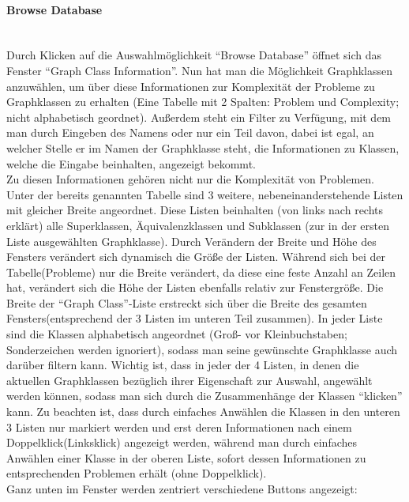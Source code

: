 \documentclass[10pt,a4paper]{article}
\begin{document}
\paragraph{Browse Database}\ \\
Durch Klicken auf die Auswahlmöglichkeit "`Browse Database"' öffnet sich das Fenster "`Graph Class Information"'. Nun hat man die Möglichkeit Graphklassen anzuwählen, um über diese Informationen zur Komplexität der Probleme zu Graphklassen zu erhalten (Eine Tabelle mit 2 Spalten: Problem und Complexity; nicht alphabetisch geordnet). Außerdem steht ein Filter zu Verfügung, mit dem man durch Eingeben des Namens oder nur ein Teil davon, dabei ist egal, an welcher Stelle er im Namen der Graphklasse steht, die Informationen zu Klassen, welche die Eingabe beinhalten, angezeigt bekommt.\\
Zu diesen Informationen gehören nicht nur die Komplexität von Problemen. Unter der bereits genannten Tabelle sind 3 weitere, nebeneinanderstehende Listen mit gleicher Breite angeordnet. Diese Listen beinhalten (von links nach rechts erklärt) alle Superklassen, Äquivalenzklassen und Subklassen (zur in der ersten Liste ausgewählten Graphklasse). Durch Verändern der Breite und Höhe des Fensters verändert sich dynamisch die Größe der Listen. Während sich bei der Tabelle(Probleme) nur die Breite verändert, da diese eine feste Anzahl an Zeilen hat, verändert sich die Höhe der Listen ebenfalls relativ zur Fenstergröße. Die Breite der "`Graph Class"'-Liste erstreckt sich über die Breite des gesamten Fensters(entsprechend der 3 Listen im unteren Teil zusammen). In jeder Liste sind die Klassen alphabetisch angeordnet (Groß- vor Kleinbuchstaben; Sonderzeichen werden ignoriert), sodass man seine gewünschte Graphklasse auch darüber filtern kann. Wichtig ist, dass in jeder der 4 Listen, in denen die aktuellen Graphklassen bezüglich ihrer Eigenschaft zur Auswahl, angewählt werden können, sodass man sich durch die Zusammenhänge der Klassen "`klicken"' kann. Zu beachten ist, dass durch einfaches Anwählen die Klassen in den unteren 3 Listen nur markiert werden und erst deren Informationen nach einem Doppelklick(Linksklick) angezeigt werden, während man durch einfaches Anwählen einer Klasse in der oberen Liste, sofort dessen Informationen zu entsprechenden Problemen erhält (ohne Doppelklick).\\
Ganz unten im Fenster werden zentriert verschiedene Buttons angezeigt:
\end{document}
